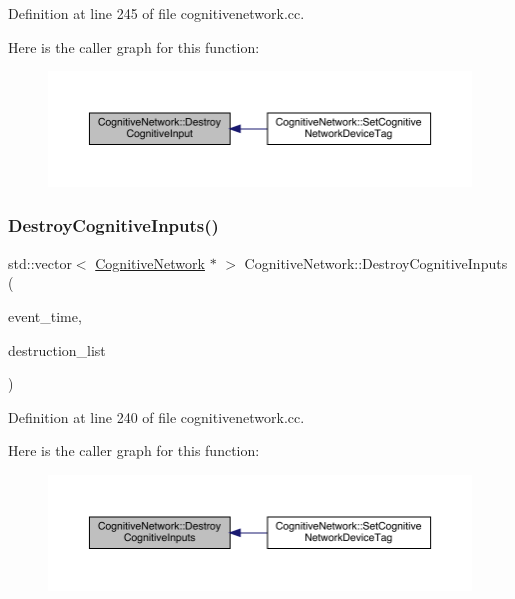 Definition at line 245 of file cognitivenetwork.\+cc.

Here is the caller graph for this function\+:
\nopagebreak
\begin{figure}[H]
\begin{center}
\leavevmode
\includegraphics[width=350pt]{class_cognitive_network_a12e085cd47b7661190527fe55b6da8dc_icgraph}
\end{center}
\end{figure}
\mbox{\label{class_cognitive_network_a00aa44de67dd0593a2498ce7a3b4c0f2}} 
\subsubsection{\texorpdfstring{Destroy\+Cognitive\+Inputs()}{DestroyCognitiveInputs()}}
{\footnotesize\ttfamily std\+::vector$<$ \hyperlink{class_cognitive_network}{Cognitive\+Network} $\ast$ $>$ Cognitive\+Network\+::\+Destroy\+Cognitive\+Inputs (\begin{DoxyParamCaption}\item[{std\+::chrono\+::time\+\_\+point$<$ \hyperlink{universe_8h_a0ef8d951d1ca5ab3cfaf7ab4c7a6fd80}{Clock} $>$}]{event\+\_\+time,  }\item[{std\+::vector$<$ \hyperlink{class_cognitive_network}{Cognitive\+Network} $\ast$$>$}]{destruction\+\_\+list }\end{DoxyParamCaption})}



Definition at line 240 of file cognitivenetwork.\+cc.

Here is the caller graph for this function\+:
\nopagebreak
\begin{figure}[H]
\begin{center}
\leavevmode
\includegraphics[width=350pt]{class_cognitive_network_a00aa44de67dd0593a2498ce7a3b4c0f2_icgraph}
\end{center}
\end{figure}
\mbox{\label{class_cognitive_network_a8475cf7277d25532bb31926e768600e8}} 
